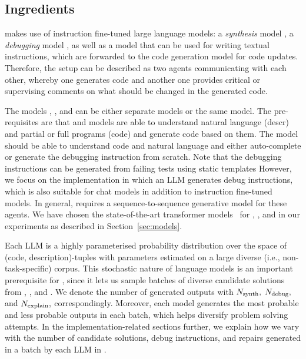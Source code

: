  

\newpage \subsection{Ingredients}
\label{sec:ingredients}

\method{} makes use of instruction fine-tuned large language models: a \emph{synthesis} model \synthmodel{}, a \emph{debugging} model \debugmodel{}, as well as a model \textmodel{} that can be used for writing textual instructions, which are forwarded to the code generation model \debugmodel{} for code updates. 
Therefore, the setup can be described as two agents communicating with each other, whereby one generates code and another one provides critical or supervising comments on what should be changed in the generated code. 

The models \synthmodel{}, \debugmodel{}, and \textmodel{} can be either separate models or the same model.
The pre-requisites are that \synthmodel{} and \debugmodel{} models are able to understand natural language (descr) and partial or full programs (code) and generate code based on them. 
The model \textmodel{} should be able to understand code and natural language and either auto-complete or generate the debugging instruction from scratch. 
Note that the debugging instructions can be generated from failing tests using static templates 
However, we focus on the implementation in which an LLM generates debug instructions, which is also suitable for chat models in addition to instruction fine-tuned models. 
In general, \method{} requires a sequence-to-sequence generative model for these agents. 
We have chosen the state-of-the-art transformer models~\cite{vaswaniAttentionAllYou2023} for \synthmodel{}, \debugmodel{}, and \textmodel{} in our experiments as described in Section~\ref{sec:models}. 

Each LLM is a highly parameterised probability distribution over the space of (code, description)-tuples with parameters estimated on a large diverse (i.e., non-task-specific) corpus.
This stochastic nature of language models is an important prerequisite for \method{}, since it lets us sample batches of diverse candidate solutions from \synthmodel{}, \debugmodel{}, and \textmodel{}. 
We denote the number of generated outputs with $N_\text{synth}{},$ $N_\text{debug}{},$ and $N_\text{explain}{},$ correspondingly.
Moreover, each model generates the most probable and less probable outputs in each batch, which helps diversify problem solving attempts. 
In the implementation-related sections further, we explain how we vary with the number of candidate solutions, debug instructions, and repairs generated in a batch by each LLM in \method{}.


